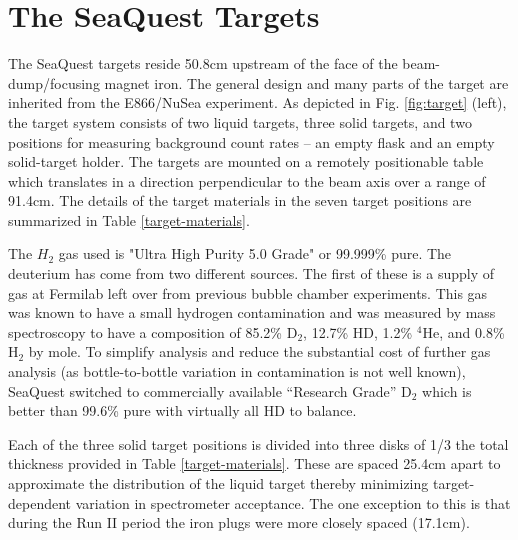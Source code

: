 \section{The SeaQuest Targets}



The SeaQuest targets reside 50.8cm upstream of the face of the beam-dump/focusing magnet iron.  The general design and many parts of the target
are inherited from the E866/NuSea experiment.   As depicted in Fig. \ref{fig:target} (left), the target system consists of two liquid targets, 
three solid targets, and two positions for measuring background count rates -- an empty flask and an empty solid-target holder.  The targets are
mounted on a remotely positionable table which translates in a direction perpendicular to the beam axis over a range of 91.4cm.
The details of the target materials in the seven target positions are summarized in Table \ref{target-materials}.

The $H_2$ gas used is "Ultra High Purity 5.0 Grade" or 99.999\% pure.  The deuterium has come from two different sources.  The first of these is a supply of gas at Fermilab left over from previous bubble chamber experiments.  This gas was known to have a small hydrogen contamination and was measured by mass spectroscopy to have a composition of 85.2\% D$_2$, 12.7\% HD, 1.2\% $^4$He, and 0.8\% H$_2$ by mole.  To simplify analysis and reduce the substantial cost of further gas analysis (as bottle-to-bottle variation in contamination is not well known), SeaQuest switched to commercially available ``Research Grade'' D$_2$ which is better than 99.6\% pure with virtually all HD to balance.


Each of the three solid target positions is divided into three disks of 1/3 the total thickness provided in Table \ref{target-materials}.  These are spaced 25.4cm apart to approximate the distribution of the liquid target thereby minimizing target-dependent variation in spectrometer acceptance.  The one exception to this is that during the Run II period the iron plugs were more closely spaced (17.1cm).

